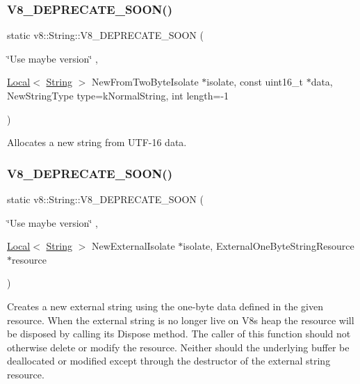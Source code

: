 \subsubsection{\texorpdfstring{V8\+\_\+\+D\+E\+P\+R\+E\+C\+A\+T\+E\+\_\+\+S\+O\+O\+N()}{V8\_DEPRECATE\_SOON()}\hspace{0.1cm}{\footnotesize\ttfamily [2/3]}}
{\footnotesize\ttfamily static v8\+::\+String\+::\+V8\+\_\+\+D\+E\+P\+R\+E\+C\+A\+T\+E\+\_\+\+S\+O\+ON (\begin{DoxyParamCaption}\item[{\char`\"{}Use maybe version\char`\"{}}]{,  }\item[{\mbox{\hyperlink{classv8_1_1Local}{Local}}$<$ \mbox{\hyperlink{classv8_1_1String}{String}} $>$ }]{New\+From\+Two\+ByteIsolate $\ast$isolate, const uint16\+\_\+t $\ast$data, New\+String\+Type type=k\+Normal\+String, int length=-\/1 }\end{DoxyParamCaption})\hspace{0.3cm}{\ttfamily [static]}}

Allocates a new string from U\+T\+F-\/16 data. \mbox{\label{classv8_1_1String_ad7186b5cfdddffbee8235a7216f31a67}} 
\subsubsection{\texorpdfstring{V8\+\_\+\+D\+E\+P\+R\+E\+C\+A\+T\+E\+\_\+\+S\+O\+O\+N()}{V8\_DEPRECATE\_SOON()}\hspace{0.1cm}{\footnotesize\ttfamily [3/3]}}
{\footnotesize\ttfamily static v8\+::\+String\+::\+V8\+\_\+\+D\+E\+P\+R\+E\+C\+A\+T\+E\+\_\+\+S\+O\+ON (\begin{DoxyParamCaption}\item[{\char`\"{}Use maybe version\char`\"{}}]{,  }\item[{\mbox{\hyperlink{classv8_1_1Local}{Local}}$<$ \mbox{\hyperlink{classv8_1_1String}{String}} $>$ }]{New\+ExternalIsolate $\ast$isolate, External\+One\+Byte\+String\+Resource $\ast$resource }\end{DoxyParamCaption})\hspace{0.3cm}{\ttfamily [static]}}

Creates a new external string using the one-\/byte data defined in the given resource. When the external string is no longer live on V8\textquotesingle{}s heap the resource will be disposed by calling its Dispose method. The caller of this function should not otherwise delete or modify the resource. Neither should the underlying buffer be deallocated or modified except through the destructor of the external string resource. 

